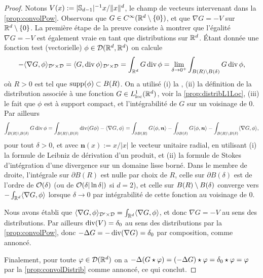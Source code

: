 \begin{proof}
\def\bn{\boldsymbol{n}}
Notons $V(x) := |\mathbb{S}_{d-1}|^{-1} x/\|x\|^d$, le champ de vecteurs intervenant dans la \cref{prop:convolPow}.
Observons que $G \in C^\infty(\mathbb{R}^d \setminus \{0\})$, et que $\nabla G = - V$ sur $\mathbb{R}^d \setminus \{0\}$.
	La première étape de la preuve consiste à montrer que l'égalité $\nabla G = - V$ est également vraie en tant que distributions sur $\mathbb{R}^d$. Étant donnée une fonction test (vectorielle) $\phi \in \mathcal{D}(\mathbb{R}^d,\mathbb{R}^d)$ on calcule
	\begin{equation*}
		- \langle\nabla G,\phi\rangle_{\mathcal{D}' \times \mathcal{D}} 
		= \langle G,\operatorname{div} \phi\rangle_{\mathcal{D}' \times \mathcal{D}} 
		= \int_{\mathbb{R}^d} G \operatorname{div} \phi 
		= \lim_{\delta \to 0^+} \int_{B(R) \setminus B(\delta)} G \operatorname{div} \phi,
	\end{equation*}
	où $R>0$ est tel que $\operatorname{supp} (\phi) \subset B(R)$. On a utilisé (i) la , (ii) la définition de la distribution associée à une fonction $G \in L^1_{\mathrm{loc}}(\mathbb{R}^d)$, voir la \cref{prop:distribL1Loc}, (iii) le fait que $\phi$ est à support compact, et l'intégrabilité de $G$ sur un voisinage de $0$. Par ailleurs
	\begin{equation*}
		\int_{B(R) \sm B(\delta)} G \diver \phi = \int_{B(R) \sm B(\delta)} \diver(G \phi) - \<\nabla G,\phi\> = \int_{\partial B(R)} G\<\phi,\bn\> - \int_{\partial B(\delta)} G\<\phi,\bn\> - \int_{B(R) \sm B(\delta)} \<\nabla G,\phi\>,
	\end{equation*}
	pour tout $\delta>0$, et avec $\bn(x):=x/|x|$ le vecteur unitaire radial, en utilisant (i) la formule de Leibniz de dérivation d'un produit, et (ii) la formule de Stokes d'intégration d'une divergence sur un domaine lisse borné.
	Dans le membre de droite, l'intégrale sur $\partial B(R)$ est nulle par choix de $R$, celle sur $\partial B(\delta)$ est de l'ordre de $\mathcal{O}(\delta)$ (ou de $\mathcal{O}(\delta |\ln \delta|)$ si $d=2$), et celle sur $B(R) \setminus B(\delta)$ converge vers $-\int_{\mathbb{R}^d} \langle\nabla G,\phi\rangle$ lorsque $\delta\to 0$ par intégrabilité de cette fonction au voisinage de $0$.
	
	Nous avons établi que $\langle\nabla G,\phi\rangle_{\mathcal{D}' \times \mathcal{D}} = \int_{\mathbb{R}^d} \langle\nabla G,\phi\rangle$, et donc $\nabla G = - V$ au sens des distributions. Par ailleurs $\operatorname{div}( V ) = \delta_0$ au sens des distributions par la \cref{prop:convolPow}, donc $-\Delta G = -\operatorname{div}(\nabla G) = \delta_0$ par composition, comme annoncé.
	
	Finalement, pour toute $\varphi \in \mathcal{D}(\mathbb{R}^d)$ on a $-\Delta(G \star \varphi) = (-\Delta G) \star \varphi =  \delta_0 \star \varphi = \varphi$ par la \cref{prop:convolDistrib} comme annoncé, ce qui conclut.
\end{proof}



